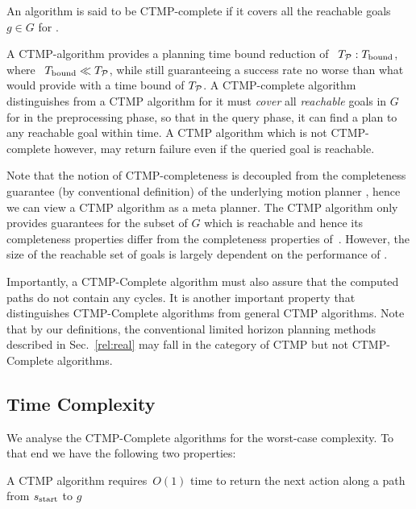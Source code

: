 \documentclass[a4paper]{report}
\begin{document}
\vspace{2mm}
\begin{definition}
\label{def:complete}
An algorithm is said to be CTMP-complete if it covers all the reachable goals $g \in G$ for \Sstart.
\end{definition}

A CTMP-algorithm provides a planning time bound reduction of ~$T_\mathcal{P} : T_{\textrm{bound}}$, where ~$T_{\textrm{bound}} \ll T_\textrm{\ensuremath{\mathcal{P}}}$, while still guaranteeing a success rate no worse than what \calP would provide with a time bound of $T_\mathcal{P}$.
%
A CTMP-complete algorithm distinguishes from a CTMP algorithm for it must \emph{cover} all \emph{reachable} goals in $G$ for \Sstart in the preprocessing phase, so that in the query phase, it can find a plan to any reachable goal within \Tbound time. A CTMP algorithm which is not CTMP-complete however, may return failure even if the queried goal is reachable.
%

Note that the notion of CTMP-completeness is decoupled from the completeness guarantee (by conventional definition) of the underlying motion planner \calP, hence we can view a CTMP algorithm as a meta planner. The CTMP algorithm only provides guarantees for the subset of $G$ which is reachable and hence its completeness properties differ from the completeness properties of~\calP. However, the size of the reachable set of goals is largely dependent on the performance of \calP.

Importantly, a CTMP-Complete algorithm must also assure that the computed paths do not contain any cycles. It is another important property that distinguishes CTMP-Complete algorithms from general CTMP algorithms. Note that by our definitions, the conventional limited horizon planning methods described in Sec.~\ref{rel:real} may fall in the category of CTMP but not CTMP-Complete algorithms. 

\subsection{Time Complexity}
We analyse the CTMP-Complete algorithms for the worst-case complexity. To that end we have the following two properties:

\vspace{2mm}
\begin{property}
\label{ctmp:prop1}
A CTMP algorithm requires~$O(1)$ time to return the next action along a path from $s_{\text{start}}$ to $g$
\end{property}
\end{document}
